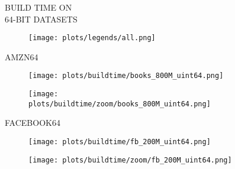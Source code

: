\documentclass{article}
\begin{document}
\begin{figure}[!htbp]
\fbox
{
\begin{minipage}[t][0.98\textheight][t]{\textwidth}
\centering
\vspace*{-5px}
    \begin{minipage}{0.2\linewidth}
    \footnotesize{BUILD TIME ON  \\ 64-BIT DATASETS}
    \end{minipage}
   \begin{minipage}{0.75\linewidth}
        \begin{figure}[H]
        \texttt{[image: plots/legends/all.png]}
        \end{figure}
    \end{minipage}
    \vspace*{-14px}
    
    \begin{minipage}{0.03\linewidth}
    \begin{sideways}\small AMZN64\end{sideways}
    \end{minipage}
    \begin{minipage}{0.38\linewidth}
        \begin{figure}[H]
        \texttt{[image: plots/buildtime/books\_800M\_uint64.png]}
        \end{figure}
    \end{minipage}
    \begin{minipage}{0.38\linewidth}
        \begin{figure}[H]
            \texttt{[image: plots/buildtime/zoom/books\_800M\_uint64.png]}
        \end{figure}
    \end{minipage}
\vspace*{-0.6cm}

\begin{minipage}{0.03\linewidth}
    \begin{sideways}\small FACEBOOK64\end{sideways}
    \end{minipage}
    \begin{minipage}{0.38\linewidth}
        \begin{figure}[H]
        \texttt{[image: plots/buildtime/fb\_200M\_uint64.png]}
        \end{figure}
    \end{minipage}
    \begin{minipage}{0.38\linewidth}
        \begin{figure}[H]
            \texttt{[image: plots/buildtime/zoom/fb\_200M\_uint64.png]}
        \end{figure}
    \end{minipage}
\vspace*{-0.6cm}


\end{minipage}}
\end{figure}
\end{document}

